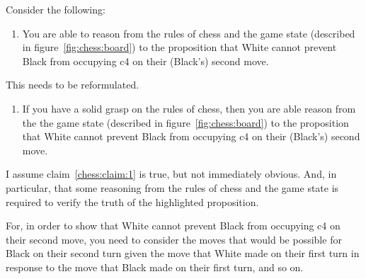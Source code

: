 \documentclass[10pt]{article}
\begin{document}
Consider the following:
\begin{enumerate}
\item\label{chess:claim:1} You are able to reason from the rules of chess and the game state (described in figure~\ref{fig:chess:board}) to the proposition that White cannot prevent Black from occupying c4 on their (Black's) second move.
\end{enumerate}
{
  \color{red}
  This needs to be reformulated.
  \begin{enumerate}
  \item If you have a solid grasp on the rules of chess, then you are able reason from the the game state (described in figure~\ref{fig:chess:board}) to the proposition that White cannot prevent Black from occupying c4 on their (Black's) second move.
  \end{enumerate}
}


I assume claim~\ref{chess:claim:1} is true, but not immediately obvious.
And, in particular, that some reasoning from the rules of chess and the game state is required to verify the truth of the highlighted proposition.

For, in order to show that White cannot prevent Black from occupying c4 on their second move, you need to consider the moves that would be possible for Black on their second turn given the move that White made on their first turn in response to the move that Black made on their first turn, and so on.
\end{document}
